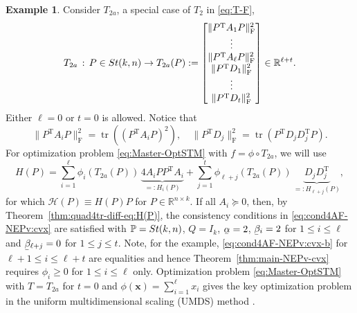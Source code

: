 \documentclass[11pt]{article}
\def\bx{\pmb{x}}
\def\bbP{\mathbb{P}}
\def\bbR{\mathbb{R}}
\def\scrH{\mathscr{H}}
\newcommand\munderbar[1]{%
  \underaccent{\bar}{#1}}
\newcommand\STM[2]{{\rm St}(#1,#2)}
\DeclareMathOperator{\tr}{tr}
\DeclareMathOperator{\F}{F}
\DeclareMathOperator{\T}{T}
\theoremstyle{definition}
\newtheorem{example}{Example}[section]
\numberwithin{equation}{section}
\begin{document}
\begin{example}\label{eg:T2a}
Consider $T_{2a}$, a special case of $T_2$ in \eqref{eq:T-F},
\begin{equation}\label{eq:T-F-a}
T_{2a}\,:\, P\in\STM{k}{n} \to T_{2a}(P):=\begin{bmatrix}
                                        \|P^{\T}A_1P\|_{\F}^2 \\
                                        \vdots \\
                                        \|P^{\T}A_{\ell}P\|_{\F}^2 \\
                                        \|P^{\T}D_1\|_{\F}^2 \\
                                        \vdots \\
                                        \|P^{\T}D_t\|_{\F}^2 \\
                                      \end{bmatrix} \in\bbR^{\ell+t}.
\end{equation}
Either $\ell=0$ or $t=0$ is allowed. Notice that
$$
\|P^{\T}A_iP\|_{\F}^2=\tr((P^{\T}A_iP)^2), \quad
\|P^{\T}D_j\|_{\F}^2=\tr(P^{\T}D_jD_j^{\T}P).
$$
For optimization problem \eqref{eq:Master-OptSTM} with
$f=\phi\circ T_{2a}$, we will use
\begin{equation}\label{eq:H(P)-comp-T2a}
H(P)=\sum_{i=1}^{\ell}\phi_i(T_{2a}(P))\,\underbrace{4A_iPP^{\T}A_i}_{=:H_i(P)}
     +\sum_{j=1}^{t} \phi_{\ell+j}(T_{2a}(P))\, \underbrace{D_jD_j^{\T}}_{=:H_{\ell+j}(P)},
\end{equation}
for which $\scrH(P)\equiv H(P)P$ for $P\in\bbR^{n\times k}$.
If all $A_i\succeq 0$, then, by Theorem~\ref{thm:quad4tr-diff-eq:H(P)},
the consistency conditions in \eqref{eq:cond4AF-NEPv:cvx} are satisfied with $\bbP=\STM{k}{n}$, $Q=I_k$,
$\munderbar\alpha=2$, $\munderbar\beta_i=2$ for $1\le i\le\ell$ and $\munderbar\beta_{\ell+j}=0$ for $1\le j\le t$.
Note, for the example, \eqref{eq:cond4AF-NEPv:cvx-b} for $\ell+1\le i\le \ell+t$ are equalities and hence
Theorem~\ref{thm:main-NEPv-cvx} requires
$\phi_i\ge 0$ for $1\le i\le\ell$ only.
Optimization problem \eqref{eq:Master-OptSTM} with $T=T_{2a}$ for $t=0$
and
$\phi(\bx)=\sum_{i=1}^{\ell}x_i$
gives the key optimization problem in the uniform multidimensional scaling (UMDS) method \cite{zhzl:2017}.


\end{example}
\end{document}
